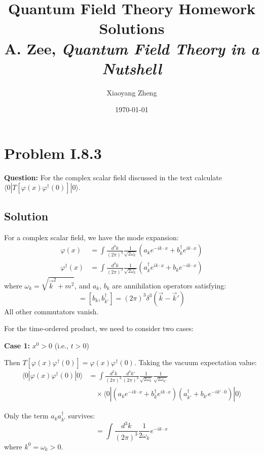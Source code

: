 \documentclass[12pt]{article}
\title{Quantum Field Theory Homework Solutions \\ \large A. Zee, \textit{Quantum Field Theory in a Nutshell}}
\author{Xiaoyang Zheng}
\date{\today}
\begin{document}
\maketitle

\section*{Problem I.8.3}
\textbf{Question:} For the complex scalar field discussed in the text calculate $\langle 0 | T[\varphi(x)\varphi^\dagger(0)] | 0 \rangle$.

\subsection*{Solution}

For a complex scalar field, we have the mode expansion:
\begin{align}
\varphi(x) &= \int \frac{d^3k}{(2\pi)^3} \frac{1}{\sqrt{2\omega_k}} \left( a_k e^{-ik\cdot x} + b_k^\dagger e^{ik\cdot x} \right) \\
\varphi^\dagger(x) &= \int \frac{d^3k}{(2\pi)^3} \frac{1}{\sqrt{2\omega_k}} \left( a_k^\dagger e^{ik\cdot x} + b_k e^{-ik\cdot x} \right)
\end{align}
where $\omega_k = \sqrt{\vec{k}^2 + m^2}$, and $a_k$, $b_k$ are annihilation operators satisfying:
\begin{equation}
[a_k, a_{k'}^\dagger] = [b_k, b_{k'}^\dagger] = (2\pi)^3 \delta^3(\vec{k} - \vec{k}')
\end{equation}
All other commutators vanish.

For the time-ordered product, we need to consider two cases:

\textbf{Case 1:} $x^0 > 0$ (i.e., $t > 0$)

Then $T[\varphi(x)\varphi^\dagger(0)] = \varphi(x)\varphi^\dagger(0)$. Taking the vacuum expectation value:
\begin{align}
\langle 0 | \varphi(x)\varphi^\dagger(0) | 0 \rangle &= \int \frac{d^3k}{(2\pi)^3} \frac{d^3k'}{(2\pi)^3} \frac{1}{\sqrt{2\omega_k}} \frac{1}{\sqrt{2\omega_{k'}}} \nonumber \\
&\quad \times \langle 0 | (a_k e^{-ik\cdot x} + b_k^\dagger e^{ik\cdot x})(a_{k'}^\dagger + b_{k'} e^{-ik'\cdot 0}) | 0 \rangle
\end{align}

Only the term $a_k a_{k'}^\dagger$ survives:
\begin{equation}
= \int \frac{d^3k}{(2\pi)^3} \frac{1}{2\omega_k} e^{-ik\cdot x}
\end{equation}
where $k^0 = \omega_k > 0$.
\end{document}
